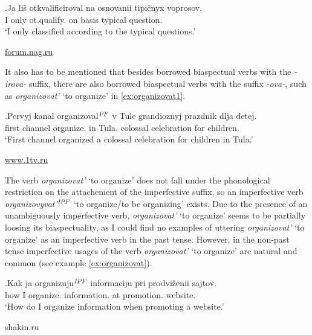 \exg.\label{ex:otkvalificirovat'}Ja li\v{s} otkvalificiroval na osnovanii tipi\v{c}nyx voprosov.\\
I only ot.qualify. on basis typical question.\\
\vspace{0.5em}
`I only classified according to the typical questions.'
\begin{flushright}
\vspace{-0.5em}
\url{forum.nag.ru}
\end{flushright}

It also has to be mentioned that besides borrowed biaspectual verbs with the \textit{-irova-} suffix, there are also borrowed biaspectual verbs with the suffix \textit{-ova-}, such as \textit{organizovat'} `to organize' in \ref{ex:organizovat1}. 

\exg.\label{ex:organizovat1}Pervyj kanal organizoval$^{\mathit{PF}}$ v Tule grandioznyj prazdnik dlja detej.\\
first channel organize. in Tula. colossal celebration for children.\\
\vspace{0.5em}
`First channel organized a colossal celebration for children in Tula.'
\begin{flushright}
\vspace{-0.5em}
\url{www.1tv.ru}
\end{flushright}

The verb \textit{organizovat'} `to organize' does not fall under the phonological restriction on the attachement of the imperfective suffix, so an imperfective verb \textit{organizovyvat'}$^{\mathit{IPF}}$ `to organize/to be organizing' exists. Due to the presence of an unambiguously imperfective verb, \textit{organizovat'} `to organize' seems to be partially loosing its biaspectuality, as I could find no examples of uttering \textit{organizovat'} `to organize' as an imperfective verb in the past tense. However, in the non-past tense imperfective usages of the verb \textit{organizovat'} `to organize' are natural and common (see example \ref{ex:organizovat}).

\exg.\label{ex:organizovat}Kak ja organizuju$^{\mathit{IPF}}$ informaciju pri prodvi\v{z}enii sajtov.\\
how I organize. information. at promotion. website.\\
\vspace{0.5em}
`How do I organize information when promoting a website.'
\begin{flushright}
\vspace{-0.5em}
shakin.ru
\end{flushright}

